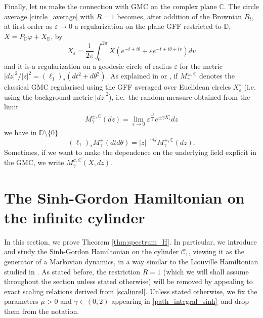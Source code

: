 \documentclass[11pt]{amsart}
\numberwithin{equation}{section}
\newcounter{exa}
\theoremstyle{definition}
\newcommand{\C}{\mathbb{C}}
\newcommand{\D}{\mathbb{D}}
\newcommand{\mc}{\mathcal}
\def\eps{\varepsilon}
\begin{document}
Finally, let us make the connection with GMC on the complex plane $\C$. 
The circle average \eqref{circle_average} with $R=1$ becomes, after addition of the Brownian $B_t$, at first order as $\eps \to 0$ a regularization on the plane GFF restricted to $\D$, $X=P_\D\varphi+X_\D$,  by 
\[ X_\eps=\frac{1}{2\pi} \int_{0}^{2\pi} X(e^{-t+i\theta}+\eps e^{-t+i\theta+iv})dv\]
and it is a regularization on a geodesic circle of radius $\eps$ for the metric $|dz|^2/|z|^2=(\ell_1)_*(dt^2+d\theta^2)$. 
As explained in \cite[Proposition 3.4]{GRV} or \cite[Theorem 2.8]{Berestycki_lqggff}, if $M_\gamma^{\pm,\C}$ denotes the classical GMC regularised using the GFF averaged over Euclidean circles  $X^\circ_\eps$ (i.e. using the background metric $|dz|^2$), i.e.\ the random measure obtained from the limit
\begin{align*}
M_{\gamma}^{\pm,\C}(dz)
=   
\lim_{\eps \rightarrow 0}\eps^{\frac{\gamma^2}2}e^{\pm \gamma X^\circ _\eps}dz
\end{align*}
 we have in $\D \setminus \{0\}$
\begin{equation}\label{linkGMC} 
(\ell_1)_*M^{\pm}_{\gamma}(dtd\theta)=|z|^{-\gamma Q}M^{\pm,\C}_\gamma(dz).
\end{equation}
Sometimes, if we want to make the dependence on the underlying field explicit in the GMC, we write $M_\gamma^{\sigma,\C}(X,dz)$.















\section{The Sinh-Gordon Hamiltonian on the infinite cylinder}\label{sec:Hamiltonian}

In this section, we prove Theorem \ref{thm:spectrum_H}. In particular, we introduce and study the Sinh-Gordon Hamiltonian on the cylinder $\mc{C}_1$, viewing it as the generator of a Markovian dynamics, in a way similar to the Liouville Hamiltonian studied in \cite{GKRV}. As stated before, the restriction $R=1$ (which we will shall assume throughout the section unless stated otherwise) will be removed by appealing to exact scaling relations derived from \eqref{scalinrel}. Unless stated otherwise, we fix the parameters $\mu>0$ and $\gamma\in(0,2)$ appearing in \eqref{path_integral_sinh} and drop them from the notation.
\end{document}
